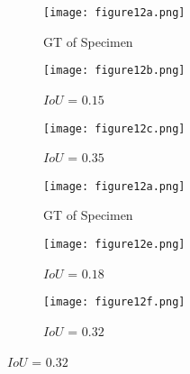 \begin{figure} [!h]
	\centering
	\begin{subfigure}[b]{0.32\textwidth}
		\centering
		\texttt{[image: figure12a.png]}
		\caption{GT of Specimen~}
		\label{fig:gt_specimen_2}
	\end{subfigure}
	\hfill
	\begin{subfigure}[b]{0.32\textwidth}
		\centering
		\texttt{[image: figure12b.png]}
		\caption{\(IoU\) = \(0.15\)} 
		\label{fig:L3_S2_B_saeed}
	\end{subfigure}
	\hfill
	\begin{subfigure}[b]{0.32\textwidth}
		\centering
		\texttt{[image: figure12c.png]}
		\caption{\(IoU\) = \(0.35\)} 
		\label{fig:L3_S2_B_ijjeh}
	\end{subfigure}
	\par\medskip
	\begin{subfigure}[b]{0.32\textwidth}
		\centering
		\texttt{[image: figure12a.png]}
		\caption{GT of Specimen~}
		\label{fig:gt_specimen_3}
	\end{subfigure}
	\hfill
	\begin{subfigure}[b]{0.32\textwidth}
		\centering
		\texttt{[image: figure12e.png]}
		\caption{\(IoU\) = \(0.18\)} 
		\label{fig:L3_S3_B_saeed}
	\end{subfigure}
	\hfill
	\begin{subfigure}[b]{0.32\textwidth}
		\centering
		\texttt{[image: figure12f.png]}
		\caption{\(IoU\) = \(0.32\)} 
		\label{fig:L3_S3_B_ijjeh}
	\end{subfigure}

\end{figure}
